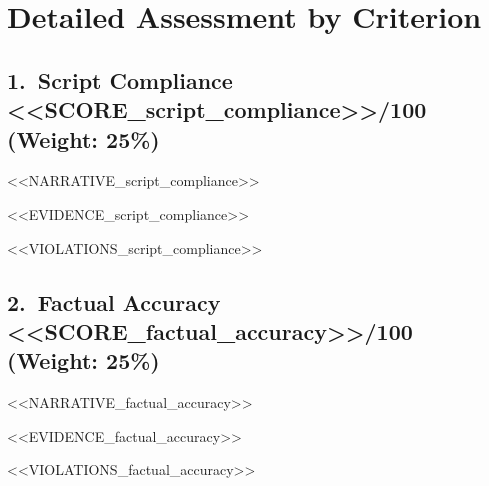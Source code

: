 \documentclass[12pt,a4paper]{article}
\begin{document}
\section{Detailed Assessment by Criterion}

\subsection{1.\ Script Compliance \hfill
  \textcolor{<<COLOR_script_compliance>>}{<<SCORE_script_compliance>>/100}
  \normalfont\small\quad(Weight: 25\%)}

<<NARRATIVE_script_compliance>>

\begin{tcolorbox}[evidencebox]
\begin{itemize}[leftmargin=1.2em, itemsep=2pt, topsep=0pt]
<<EVIDENCE_script_compliance>>
\end{itemize}
\end{tcolorbox}

\begin{tcolorbox}[violationbox]
\begin{itemize}[leftmargin=1.2em, itemsep=2pt, topsep=0pt]
<<VIOLATIONS_script_compliance>>
\end{itemize}
\end{tcolorbox}

\subsection{2.\ Factual Accuracy \hfill
  \textcolor{<<COLOR_factual_accuracy>>}{<<SCORE_factual_accuracy>>/100}
  \normalfont\small\quad(Weight: 25\%)}

<<NARRATIVE_factual_accuracy>>

\begin{tcolorbox}[evidencebox]
\begin{itemize}[leftmargin=1.2em, itemsep=2pt, topsep=0pt]
<<EVIDENCE_factual_accuracy>>
\end{itemize}
\end{tcolorbox}

\begin{tcolorbox}[violationbox]
\begin{itemize}[leftmargin=1.2em, itemsep=2pt, topsep=0pt]
<<VIOLATIONS_factual_accuracy>>
\end{itemize}
\end{tcolorbox}
\end{document}
